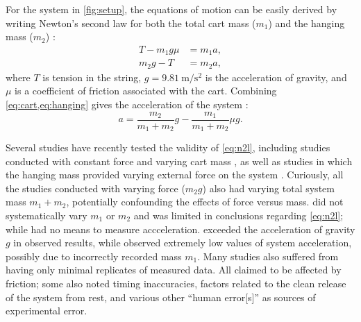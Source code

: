\documentclass[reprint,amsmath,amssymb,aps,twoside]{revtex4-2}
\begin{document}
For the system in \cref{fig:setup}, the equations of motion can be easily derived by writing Newton's second law for both the total cart mass ($m_1$) and the hanging mass ($m_2$) \cite{tipler, barrons}:
\begin{align}
T - m_1 g \mu &= m_1 a, \label{eq:cart}\\
m_2 g - T &= m_2 a, \label{eq:hanging}
\end{align}
where $T$ is tension in the string, $g=\qty{9.81}{\meter\per\second\squared}$ is the acceleration of gravity, and $\mu$ is a coefficient of friction associated with the cart. Combining \cref{eq:cart,eq:hanging} gives the acceleration of the system \cite{tipler,barrons}:
\begin{equation}
a = \dfrac{m_2}{m_1+m_2} g - \dfrac{m_1}{m_1+m_2} \mu g.
\label{eq:fricdimensional}
\end{equation}

Several studies have recently tested the validity of \cref{eq:n2l}, including studies conducted with constant force and varying cart mass  \cite{arenas-2024-testing,avalur-2024-verifying,canada-2024-experimental,kishore-2024-relationship,yagnyeshwaran-2024-verifying}, as well as studies in which the hanging mass provided varying external force on the system \cite{govardhanen-2024-newtons,kedharnath-2024-examining,krasnopolsky-2024-testing}. Curiously, all the studies \cite{govardhanen-2024-newtons,kedharnath-2024-examining,krasnopolsky-2024-testing} conducted with varying force ($m_2g$) also had varying total system mass $m_1+m_2$, potentially confounding the effects of force versus mass. \cite{perle-2024-experimental} did not systematically vary $m_1$ or $m_2$ and was limited in conclusions regarding \cref{eq:n2l}; while \cite{barone-2024-investigating} had no means to measure accceleration. \cite{krasnopolsky-2024-testing} exceeded the acceleration of gravity $g$ in observed results, while \cite{govardhanen-2024-newtons} observed extremely low values of system acceleration, possibly due to incorrectly recorded mass $m_1$. Many studies also suffered from having only minimal replicates of measured data. All \cite{arenas-2024-testing,avalur-2024-verifying,canada-2024-experimental,kishore-2024-relationship,yagnyeshwaran-2024-verifying,govardhanen-2024-newtons,kedharnath-2024-examining,krasnopolsky-2024-testing,perle-2024-experimental} claimed to be affected by friction; some also noted timing inaccuracies, factors related to the clean release of the system from rest, and various other ``human error[s]'' as sources of experimental error. 
\end{document}
